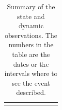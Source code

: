 {\tiny
\begin{longtable}{
	p{}%
 	p{}
 	p{}%
 	p{}
 	p{}%
 	p{}
 	p{}%
 	p{}}
 	
\caption{Summary of the state and dynamic observations. The numbers in the table
are the dates or the intervals where to see the event
described.}\label{tab:AnSP1}\\
 	\hline
 	\endhead
 	
\hline
\endfoot


\end{longtable}}
